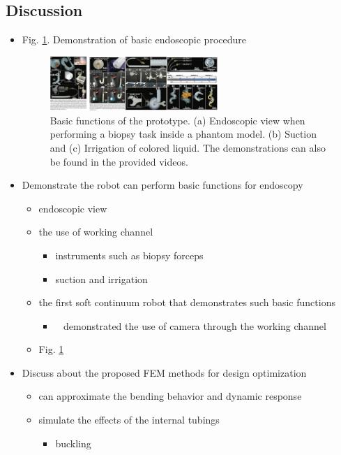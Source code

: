 \documentclass[journal,onecolumn]{IEEEtran}
\begin{document}
\subsection{Discussion}
\label{sec:org1055a02}

\begin{itemize}
\item Fig. \ref{fig:orgbb5ed76}. Demonstration of basic endoscopic procedure

\begin{figure}[!h]
\centering
\includegraphics[width=0.6\textwidth]{./fig/fig-demo_basics.png}
\caption{\label{fig:orgbb5ed76}
Basic functions of the prototype. (a) Endoscopic view when performing a biopsy task inside a phantom model. (b) Suction and (c) Irrigation of colored liquid. The demonstrations can also be found in the provided videos.}
\end{figure}

\item Demonstrate the robot can perform basic functions for endoscopy
\begin{itemize}
\item endoscopic view
\item the use of working channel
\begin{itemize}
\item instruments such as biopsy forceps
\item suction and irrigation
\end{itemize}
\item the first soft continuum robot that demonstrates such basic functions
\begin{itemize}
\item ~\cite{martinez2012robotic} demonstrated the use of camera through the working channel
\end{itemize}
\item Fig. \ref{fig:orgbb5ed76}
\end{itemize}

\item Discuss about the proposed FEM methods for design optimization 
\begin{itemize}
\item can approximate the bending behavior and dynamic response
\item simulate the effects of the internal tubings
\begin{itemize}
\item buckling
\end{itemize}
\end{itemize}


\end{itemize}
\end{document}
